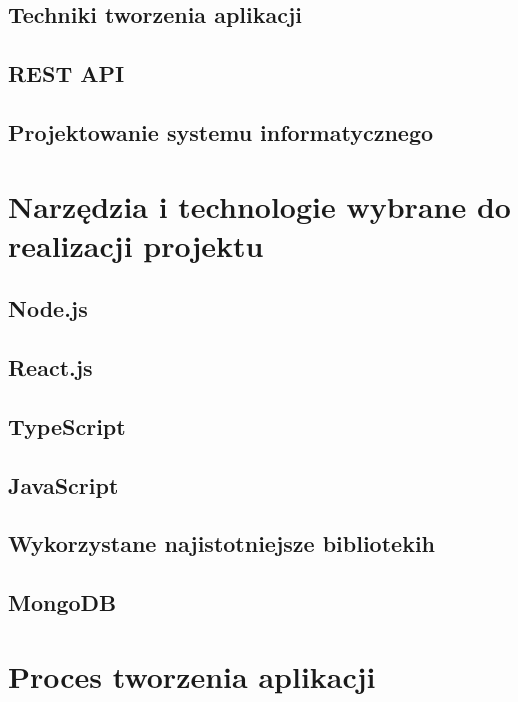 \documentclass[12pt]{article}
\begin{document}
\begin{sloppypar}
{{}
\subsection{Techniki tworzenia aplikacji}
{

}
\subsection{REST API}
{

}
\subsection{Projektowanie systemu informatycznego}
{

}
}

\section{Narzędzia i technologie wybrane do realizacji projektu}
{
\subsection{Node.js}
{

}
\subsection{React.js}
{

}
\subsection{TypeScript}
{

}
\subsection{JavaScript}
{

}
\subsection{Wykorzystane najistotniejsze bibliotekih}
{

}
\subsection{MongoDB}
{

}
}

\section{Proces tworzenia aplikacji}
{

}
\end{sloppypar}
\end{document}
